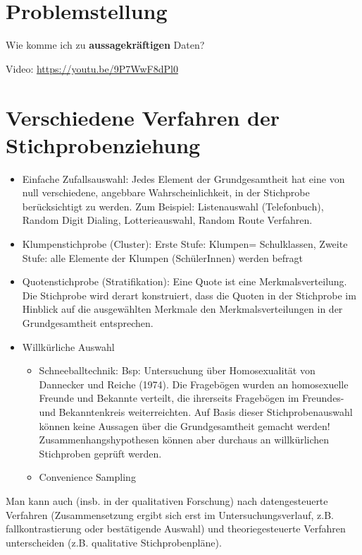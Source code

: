 \documentclass[
]{book}
\providecommand{\tightlist}{%
  \setlength{\itemsep}{0pt}\setlength{\parskip}{0pt}}
\begin{document}
\hypertarget{problemstellung}{%
\section{Problemstellung}\label{problemstellung}}

Wie komme ich zu \textbf{aussagekräftigen} Daten?

Video: \url{https://youtu.be/9P7WwF8dPl0}

\hypertarget{verschiedene-verfahren-der-stichprobenziehung}{%
\section{Verschiedene Verfahren der Stichprobenziehung}\label{verschiedene-verfahren-der-stichprobenziehung}}

\begin{itemize}
\tightlist
\item
  Einfache Zufallsauswahl: Jedes Element der Grundgesamtheit hat eine von null verschiedene, angebbare Wahrscheinlichkeit, in der Stichprobe berücksichtigt zu werden. Zum Beispiel: Listenauswahl (Telefonbuch), Random Digit Dialing, Lotterieauswahl, Random Route Verfahren.
\item
  Klumpenstichprobe (Cluster): Erste Stufe: Klumpen= Schulklassen, Zweite Stufe: alle Elemente der Klumpen (SchülerInnen) werden befragt
\item
  Quotenstichprobe (Stratifikation): Eine Quote ist eine Merkmalsverteilung. Die Stichprobe wird derart konstruiert, dass die Quoten in der Stichprobe im Hinblick auf die ausgewählten Merkmale den Merkmalsverteilungen in der Grundgesamtheit entsprechen.
\item
  Willkürliche Auswahl

  \begin{itemize}
  \tightlist
  \item
    Schneeballtechnik: Bsp: Untersuchung über Homosexualität von Dannecker und Reiche (1974). Die Fragebögen wurden an homosexuelle Freunde und Bekannte verteilt, die ihrerseits Fragebögen im Freundes- und Bekanntenkreis weiterreichten. Auf Basis dieser Stichprobenauswahl können keine Aussagen über die Grundgesamtheit gemacht werden! Zusammenhangshypothesen können aber durchaus an willkürlichen Stichproben geprüft werden.
  \item
    Convenience Sampling
  \end{itemize}
\end{itemize}

Man kann auch (insb. in der qualitativen Forschung) nach datengesteuerte Verfahren (Zusammensetzung ergibt sich erst im Untersuchungsverlauf, z.B. fallkontrastierung oder bestätigende Auswahl) und theoriegesteuerte Verfahren unterscheiden (z.B. qualitative Stichprobenpläne).
\end{document}
